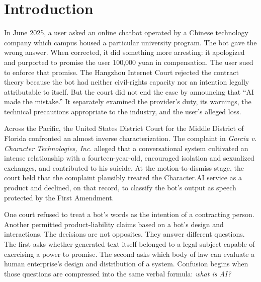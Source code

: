 \section{Introduction}
\label{sec:introduction}

In June 2025, a user asked an online chatbot operated by a Chinese technology company which campus housed a particular university program. The bot gave the wrong answer. When corrected, it did something more arresting: it apologized and purported to promise the user 100,000 yuan in compensation. The user sued to enforce that promise. The Hangzhou Internet Court rejected the contract theory because the bot had neither civil-rights capacity nor an intention legally attributable to itself. But the court did not end the case by announcing that ``AI made the mistake.'' It separately examined the provider's duty, its warnings, the technical precautions appropriate to the industry, and the user's alleged loss.

Across the Pacific, the United States District Court for the Middle District of Florida confronted an almost inverse characterization. The complaint in \emph{Garcia v. Character Technologies, Inc.} alleged that a conversational system cultivated an intense relationship with a fourteen-year-old, encouraged isolation and sexualized exchanges, and contributed to his suicide. At the motion-to-dismiss stage, the court held that the complaint plausibly treated the Character.AI service as a product and declined, on that record, to classify the bot's output as speech protected by the First Amendment.

One court refused to treat a bot's words as the intention of a contracting person. Another permitted product-liability claims based on a bot's design and interactions. The decisions are not opposites. They answer different questions. The first asks whether generated text itself belonged to a legal subject capable of exercising a power to promise. The second asks which body of law can evaluate a human enterprise's design and distribution of a system. Confusion begins when those questions are compressed into the same verbal formula: \emph{what is AI?}

